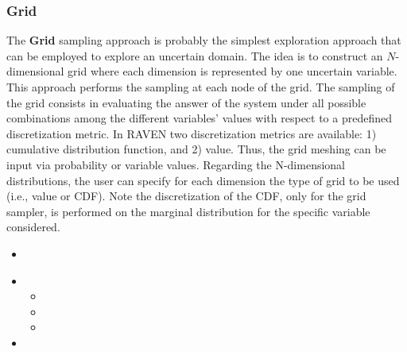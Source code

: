 \subsubsection{Grid}
\label{subsubsubsec:Grid}
The \textbf{Grid} sampling approach is probably the simplest exploration
approach that can be employed to explore an uncertain domain.
%
The idea is to construct an $N$-dimensional grid where each dimension is
represented by one uncertain variable.
%
This approach performs the sampling at each node of the grid.
%
The sampling of the grid consists in evaluating the answer of the system under
all possible combinations among the different variables' values with respect to
a predefined discretization metric.
%
In RAVEN two discretization metrics are available: 1) cumulative distribution
function, and 2) value.
%
Thus, the grid meshing can be input via probability or variable values.
%
Regarding the N-dimensional distributions, the user can specify for each dimension the type of grid to be used (i.e., value or CDF). Note the discretization of the CDF, only for the grid sampler, is performed on the marginal distribution for the specific variable considered.

%
\attrIntro
\begin{itemize}
\itemsep0em
\item \nameDescription
\end{itemize}
\begin{itemize}
\item \variableDescription
 \variableChildrenIntro
 \begin{itemize}
    \item \distributionDescription
    \item \functionDescription
    \item \gridDescription
  \end{itemize}
\item \constantVariablesDescription
\end{itemize}

